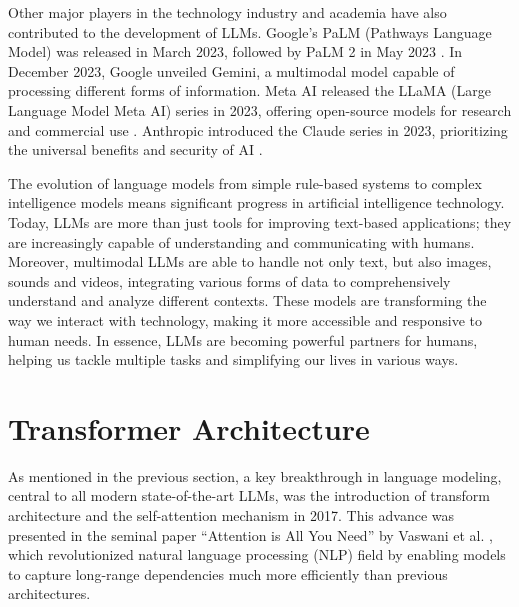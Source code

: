 Other major players in the technology industry and academia have also contributed to the development of LLMs. Google's PaLM (Pathways Language Model) was released in March 2023, followed by PaLM 2 in May 2023 \cite{chowdhery2023palm}. In December 2023, Google unveiled Gemini, a multimodal model capable of processing different forms of information. Meta AI released the LLaMA (Large Language Model Meta AI) series in 2023, offering open-source models for research and commercial use \cite{touvron2023llama}. Anthropic introduced the Claude series in 2023, prioritizing the universal benefits and security of AI \cite{anthropic2024claude}. \newline

The evolution of language models from simple rule-based systems to complex intelligence models means significant progress in artificial intelligence technology. Today, LLMs are more than just tools for improving text-based applications; they are increasingly capable of understanding and communicating with humans. Moreover, multimodal LLMs are able to handle not only text, but also images, sounds and videos, integrating various forms of data to comprehensively understand and analyze different contexts. These models are transforming the way we interact with technology, making it more accessible and responsive to human needs. In essence, LLMs are becoming powerful partners for humans, helping us tackle multiple tasks and simplifying our lives in various ways. \cite{researchgraph2024}

\section{Transformer Architecture}

As mentioned in the previous section, a key breakthrough in language modeling, central to all modern state-of-the-art LLMs, was the introduction of transform architecture and the self-attention mechanism in 2017. This advance was presented in the seminal paper “Attention is All You Need” by Vaswani et al. \cite{vaswani2017attention}, which revolutionized natural language processing (NLP) field by enabling models to capture long-range dependencies much more efficiently than previous architectures.

